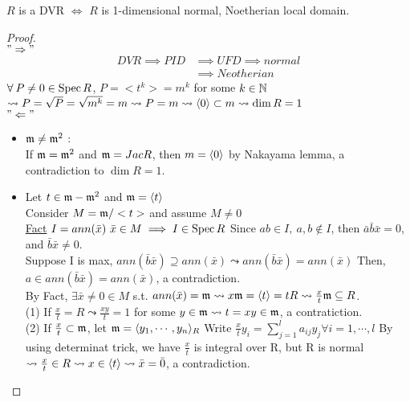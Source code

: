 \begin{prop}
  $R$ is a DVR $\iff$ $R$ is 1-dimensional normal, Noetherian local domain.
  \begin{proof} $ $ \\
    $"\Rightarrow"$ \\
    $$
      \begin{aligned}
        DVR \implies PID &\implies UFD \implies normal \\
        &\implies Neotherian
      \end{aligned}
    $$
    $\forall P \neq 0 \in \Spec R$, $P = <t^k> = m^k$ for some $k \in \mathbb{N}$
    $\leadsto P = \sqrt{P} = \sqrt{m^k} = m \leadsto P = m \leadsto
    \langle0\rangle \subset m \leadsto \dim R = 1$ \\
    $"\Leftarrow"$
    \begin{itemize}
      \item $\mathfrak{m} \ne \mathfrak{m}^2$ : \\
        If $\mathfrak{m} = \mathfrak{m}^2$ and $\mathfrak{m} = Jac R$, then $m = \langle0\rangle$ by Nakayama lemma,
        a contradiction to $\dim R = 1$.
      \item Let $t \in \mathfrak{m} - \mathfrak{m}^2$ and $\mathfrak{m} = \langle t\rangle$ \\
        Consider $M = \mathfrak{m} / <t>$ and assume $M \neq 0$ \\
        \underline{Fact} $I = ann(\bar{x})\ \bar{x} \in M \implies I \in \operatorname{Spec} R$
        Since $ab \in I,\ a,b \notin I$, then $\bar{a}\bar{b}\bar{x} = 0$, 
        and $\bar{b}\bar{x} \neq 0$. \\
        Suppose I is max, $ann(\bar{b}\bar{x}) \supseteq ann(\bar{x})
        \leadsto ann(\bar{b}\bar{x}) = ann(\bar{x})$ Then, $a \in ann(\bar{b}\bar{x})
        = ann(\bar{x})$, a contradiction. \\
        By Fact, $\exists \bar{x} \neq 0 \in M$ s.t. $ann(\bar{x}) = \mathfrak{m} \leadsto
        x\mathfrak{m} = \langle t\rangle = tR \leadsto \frac{x}{t}\mathfrak{m} \subseteq R$. \\
        (1) If $\frac{x}{t} = R \leadsto \frac{xy}{t} = 1$ for some $y \in \mathfrak{m}
        \leadsto t = xy \in \mathfrak{m}$, a contratiction. \\
        (2) If $\frac{x}{t} \subset \mathfrak{m}$, let $\mathfrak{m} = \langle y_1,\cdots, y_n\rangle_R$ Write
        $\frac{x}{t} y_i = \sum\limits_{j = 1}^{l} a_{ij}y_j \forall i = 1, \cdots,
        l$ By using determinat trick, we have $\frac{x}{t}$ is integral over R, but 
        R is normal $\leadsto \frac{x}{t} \in R \leadsto x \in \langle t\rangle \leadsto 
        \bar{x} = \bar{0}$, a contradiction. \\

\end{itemize}
\end{proof}
\end{prop}
